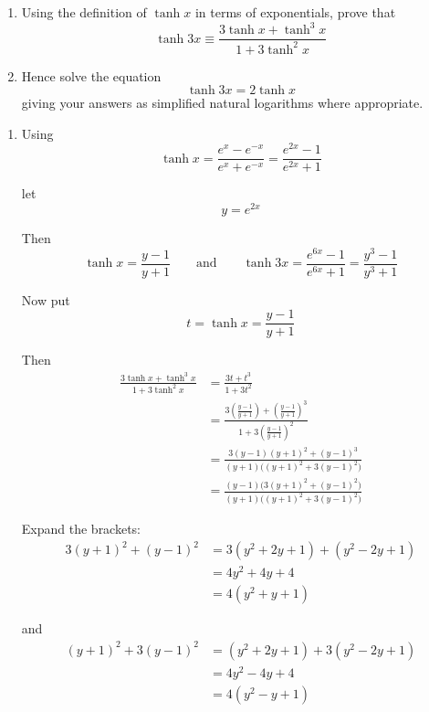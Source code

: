 \documentclass[leqno]{article}
\begin{document}
\begin{enumerate}[
  label=\textbf{\arabic*.},
  leftmargin=*,
  topsep=0pt,
  partopsep=0pt,
  parsep=0pt
]
\questionitem

\begin{enumerate}[label=\textbf{(\alph*)}]
  \item Using the definition of $\tanh x$ in terms of exponentials, prove that
  \[
  \tanh 3x \equiv \frac{3\tanh x + \tanh^3 x}{1 + 3\tanh^2 x}
  \]
  \item Hence solve the equation
  \[
  \tanh 3x = 2\tanh x
  \]
  giving your answers as simplified natural logarithms where appropriate.  \\
\end{enumerate}

\vspace*{10pt}

\begin{djsSolution}
\begin{enumerate}[label=\textbf{(\alph*)}]
\item Using
\[
\tanh x=\frac{e^x-e^{-x}}{e^x+e^{-x}}=\frac{e^{2x}-1}{e^{2x}+1}
\]

let
\[
y=e^{2x}
\]

Then
\[
\tanh x=\frac{y-1}{y+1}
\qquad\text{and}\qquad
\tanh 3x=\frac{e^{6x}-1}{e^{6x}+1}=\frac{y^3-1}{y^3+1}
\]

Now put
\[
t=\tanh x=\frac{y-1}{y+1}
\]

Then
\begin{align*}
\frac{3\tanh x+\tanh^3x}{1+3\tanh^2x}
&=\frac{3t+t^3}{1+3t^2} \\
&=\frac{3\left(\frac{y-1}{y+1}\right)+\left(\frac{y-1}{y+1}\right)^3}{1+3\left(\frac{y-1}{y+1}\right)^2} \\
&=\frac{3(y-1)(y+1)^2+(y-1)^3}{(y+1)\bigl((y+1)^2+3(y-1)^2\bigr)} \\
&=\frac{(y-1)\bigl(3(y+1)^2+(y-1)^2\bigr)}{(y+1)\bigl((y+1)^2+3(y-1)^2\bigr)}
\end{align*}

Expand the brackets:
\begin{align*}
3(y+1)^2+(y-1)^2
&=3(y^2+2y+1)+(y^2-2y+1) \\
&=4y^2+4y+4 \\
&=4(y^2+y+1)
\end{align*}

and
\begin{align*}
(y+1)^2+3(y-1)^2
&=(y^2+2y+1)+3(y^2-2y+1) \\
&=4y^2-4y+4 \\
&=4(y^2-y+1)
\end{align*}


\end{enumerate}
\end{djsSolution}
\end{enumerate}
\end{document}
